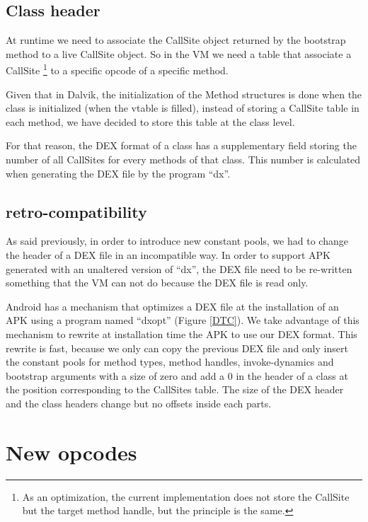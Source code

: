 \documentclass{sig-alternate}
\def \DALVIK{Dalvik\xspace}
\def \ANDROID{Android\xspace}
\begin{document}
  \subsection{Class header}

    At runtime we need to associate the CallSite object returned by the bootstrap method
    to a live CallSite object. So in the VM we need a table that associate a CallSite
    \footnote{As an optimization, the current implementation does not store the CallSite
     but the target method handle, but the principle is the same.}
    to a specific opcode of a specific method.

    Given that in \DALVIK, the initialization of the Method structures is done when
    the class is initialized (when the vtable is filled), instead of storing a CallSite
    table in each method, we have decided to store this table at the class level.
    
    For that reason, the DEX format of a class has a supplementary field storing
    the number of all CallSites for every methods of that class. 
    This number is calculated when generating the DEX file by the program ``dx''.

  \subsection{retro-compatibility}
    \label{retro}

    As said previously, in order to introduce new constant pools, we had to change
    the header of a DEX file in an incompatible way.
    In order to support APK generated with an unaltered version of ``dx'',
    the DEX file need to be re-written something that the VM can not do
    because the DEX file is read only.

    \ANDROID has a mechanism that optimizes a DEX file at the installation of
    an APK using a program named ``dxopt'' (Figure \ref{DTC}).
    We take advantage of this mechanism to rewrite at installation time the APK to use our DEX format.
    This rewrite is fast, because we only can copy the previous DEX file and only insert the
    constant pools for method types, method handles, invoke-dynamics and
    bootstrap arguments with a size of zero and add a 0 in the header of a class at the
    position corresponding to the CallSites table.
    The size of the DEX header and the class headers change but no offsets inside each parts.

\section{New opcodes}
\label{newConst}
\end{document}
